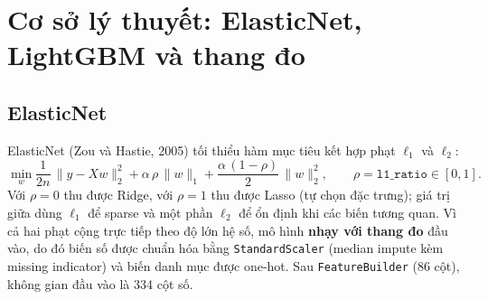 %

\section{Cơ sở lý thuyết: ElasticNet, LightGBM và thang đo}
\label{sec:theory-b}

\subsection{ElasticNet}
\label{subsec:elasticnet}

ElasticNet (Zou và Hastie, 2005) tối thiểu hàm mục tiêu kết hợp phạt $\ell_1$ và $\ell_2$:
\begin{equation}
\min_{w} \frac{1}{2n}\,\|y-Xw\|_2^2
+ \alpha\,\rho\,\|w\|_1
+ \frac{\alpha\,(1-\rho)}{2}\,\|w\|_2^2,
\qquad \rho=\texttt{l1\_ratio}\in[0,1].
\end{equation}
Với $\rho=0$ thu được Ridge, với $\rho=1$ thu được Lasso (tự chọn đặc trưng); giá trị giữa dùng $\ell_1$ để
sparse và một phần $\ell_2$ để ổn định khi các biến tương quan. Vì cả hai phạt cộng trực tiếp theo độ lớn hệ số,
mô hình \textbf{nhạy với thang đo} đầu vào, do đó biến số được chuẩn hóa bằng \texttt{StandardScaler}
(median impute kèm missing indicator) và biến danh mục được one-hot. Sau \texttt{FeatureBuilder} (86 cột),
không gian đầu vào là 334 cột số.

